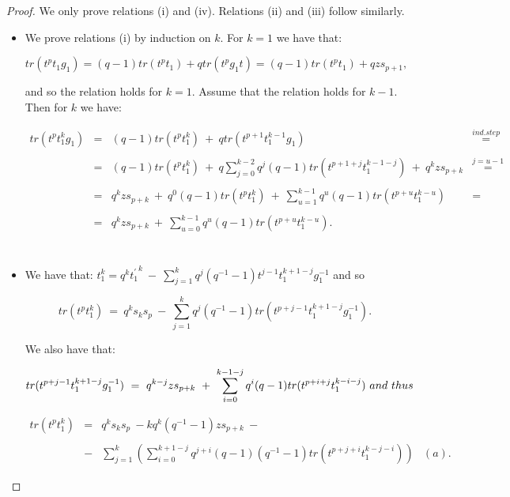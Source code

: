 \documentclass[10pt,a4paper]{amsart}
\begin{document}
\begin{proof}
We only prove relations (i) and (iv). Relations (ii) and (iii) follow similarly.

\smallbreak

\begin{itemize}
\item[i.] We prove relations (i) by induction on $k$. For $k=1$ we have that:

$$tr(t^pt_1g_1)=(q-1)tr(t^pt_1)+qtr(t^pg_1t)=(q-1)tr(t^pt_1)+qzs_{p+1},$$ 

\noindent and so the relation holds for $k=1$. Assume that the relation holds for $k-1$. Then for $k$ we have:

\[
\begin{array}{lllc}
tr(t^pt_1^kg_1) & = & (q-1)tr(t^pt_1^k)\ +\ qtr(t^{p+1}t_1^{k-1}g_1) & \overset{ind. step}{=}\\
&&&\\
& = & (q-1)tr(t^pt_1^k)\ +\ q\sum_{j=0}^{k-2}{q^j(q-1)tr(t^{p+1+j}t_1^{k-1-j})}\ +\ q^k z s_{p+k} & \overset{j=u-1}{=}\\
&&&\\
& = & q^k z s_{p+k}\ +\  q^0(q-1)tr(t^pt_1^k)\ +\ \sum_{u=1}^{k-1}{q^u(q-1)tr(t^{p+u}t_1^{k-u})} & =\\
&&&\\
& = & q^k z s_{p+k}\ + \ \sum_{u=0}^{k-1}{q^u(q-1)tr(t^{p+u}t_1^{k-u})}. &\\
\end{array}
\]
\\

\item[iv.] We have that: $t_1^k  =  q^{k}{t_1^{\prime}}^k\ -\ \sum_{j=1}^{k}{q^{j}(q^{-1}-1)t^{j-1}t_1^{k+1-j}g_1^{-1}}$ and so

$$tr(t^pt_1^k)\ =\ q^ks_ks_p\ -\ \sum_{j=1}^{k}{q^j(q^{-1}-1)tr(t^{p+j-1}t_1^{k+1-j}g_1^{-1})}.$$

\noindent We also have that:

$$tr(t^{p+j-1}t_1^{k+1-j}g_1^{-1})\ = \ q^{k-j} z s_{p+k}\ +\ \sum_{i=0}^{k-1-j}{q^i(q-1)tr(t^{p+i+j}t_1^{k-i-j})}\ {\rm and\ thus}$$

\[
\begin{array}{lcll}
tr(t^pt_1^k) & = & q^ks_ks_p\ - kq^k(q^{-1}-1)zs_{p+k}\ -&\\
&&&\\
& - &  \sum_{j=1}^{k}{\left(\sum_{i=0}^{k+1-j}{q^{j+i}(q-1)(q^{-1}-1)tr(t^{p+j+i}t_1^{k-j-i})}\right)} & (a).
\end{array}
\]


\end{itemize}
\end{proof}
\end{document}
